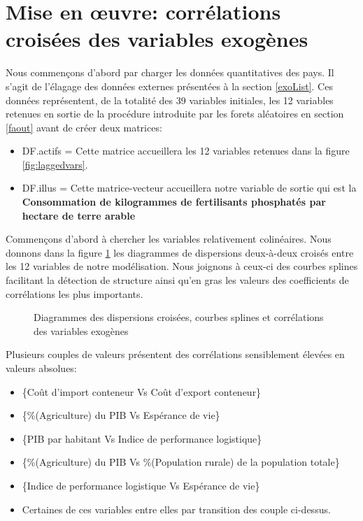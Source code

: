	\section{Mise en œuvre: corrélations croisées des variables exogènes}
	Nous commençons d'abord par charger les données quantitatives des pays. Il s'agit de l'élagage des données externes présentées à la section \ref{exoList}. Ces données représentent, de la totalité des 39 variables initiales, les 12 variables retenues en sortie de la procédure introduite par les forets aléatoires en section \ref{faout} avant de créer deux matrices:\begin{itemize}
	\item DF.actifs = Cette matrice accueillera les 12 variables retenues dans la figure \ref{fig:laggedvars}.
	\item DF.illus = Cette matrice-vecteur accueillera notre variable de sortie qui est la \textbf{Consommation de kilogrammes de fertilisants phosphatés par hectare de terre arable} 
	\end{itemize}
	Commençons d'abord à chercher les variables relativement colinéaires. Nous donnons dans la figure \ref{fig:scatter} les diagrammes de dispersions deux-à-deux croisés entre les 12 variables de notre modélisation. Nous joignons à ceux-ci des courbes splines facilitant la détection de structure ainsi qu'en gras les valeurs des coefficients de corrélations les plus importants.
			\begin{figure}[h]
				    		\centering
				    		\caption{Diagrammes des dispersions croisées, courbes splines et corrélations des variables exogènes}
				    		\label{fig:scatter}
			\end{figure}
	Plusieurs couples de valeurs présentent des corrélations sensiblement élevées en valeurs absolues:
	\begin{itemize}
	\item \{Coût d'import conteneur Vs Coût d'export conteneur\}
	\item \{\%(Agriculture) du PIB Vs Espérance de vie\}
	\item \{PIB par habitant Vs Indice de performance logistique\}
	\item \{\%(Agriculture) du PIB Vs \%(Population rurale) de la population totale\}
	\item \{Indice de performance logistique Vs Espérance de vie\}
	\item Certaines de ces variables entre elles par transition des couple ci-dessus.
	\end{itemize}

